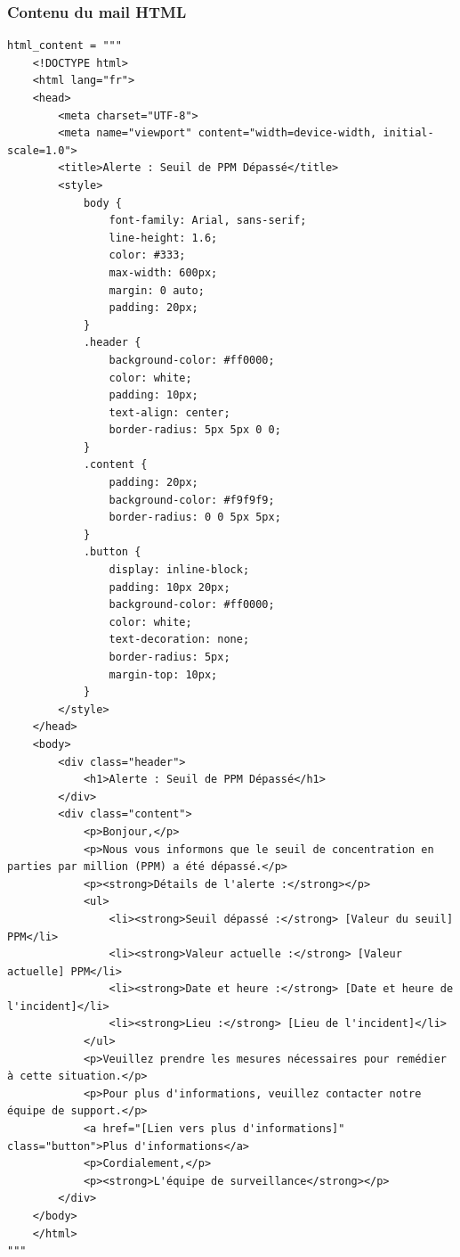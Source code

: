 \documentclass[a4paper,11pt]{article}
\begin{document}
        \subsubsection{Contenu du mail HTML}
        \begin{lstlisting}[style=html, caption={Contenu du mail HTML}]
html_content = """
    <!DOCTYPE html>
    <html lang="fr">
    <head>
        <meta charset="UTF-8">
        <meta name="viewport" content="width=device-width, initial-scale=1.0">
        <title>Alerte : Seuil de PPM Dépassé</title>
        <style>
            body {
                font-family: Arial, sans-serif;
                line-height: 1.6;
                color: #333;
                max-width: 600px;
                margin: 0 auto;
                padding: 20px;
            }
            .header {
                background-color: #ff0000;
                color: white;
                padding: 10px;
                text-align: center;
                border-radius: 5px 5px 0 0;
            }
            .content {
                padding: 20px;
                background-color: #f9f9f9;
                border-radius: 0 0 5px 5px;
            }
            .button {
                display: inline-block;
                padding: 10px 20px;
                background-color: #ff0000;
                color: white;
                text-decoration: none;
                border-radius: 5px;
                margin-top: 10px;
            }
        </style>
    </head>
    <body>
        <div class="header">
            <h1>Alerte : Seuil de PPM Dépassé</h1>
        </div>
        <div class="content">
            <p>Bonjour,</p>
            <p>Nous vous informons que le seuil de concentration en parties par million (PPM) a été dépassé.</p>
            <p><strong>Détails de l'alerte :</strong></p>
            <ul>
                <li><strong>Seuil dépassé :</strong> [Valeur du seuil] PPM</li>
                <li><strong>Valeur actuelle :</strong> [Valeur actuelle] PPM</li>
                <li><strong>Date et heure :</strong> [Date et heure de l'incident]</li>
                <li><strong>Lieu :</strong> [Lieu de l'incident]</li>
            </ul>
            <p>Veuillez prendre les mesures nécessaires pour remédier à cette situation.</p>
            <p>Pour plus d'informations, veuillez contacter notre équipe de support.</p>
            <a href="[Lien vers plus d'informations]" class="button">Plus d'informations</a>
            <p>Cordialement,</p>
            <p><strong>L'équipe de surveillance</strong></p>
        </div>
    </body>
    </html>
"""
        \end{lstlisting}
\end{document}
